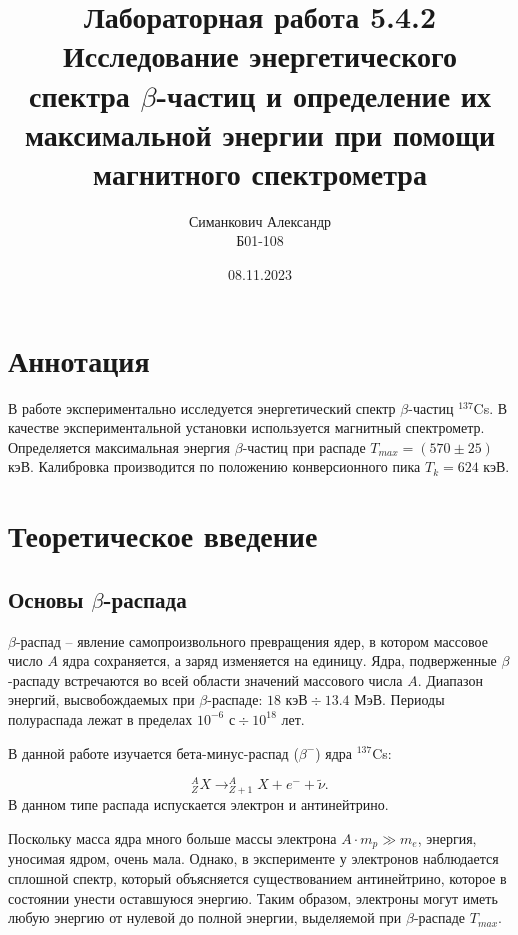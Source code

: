 \documentclass[12pt,a4paper]{article}
\title{Лабораторная работа 5.4.2 \\ Исследование энергетического спектра $\beta$-частиц и определение их максимальной энергии при помощи магнитного спектрометра}
\author{Симанкович Александр\\ Б01-108}
\date{08.11.2023}
\begin{document}
	\maketitle
	
	\section*{Аннотация}
	
	В работе экспериментально исследуется энергетический спектр $\beta$-частиц $^{137}$Cs. В качестве экспериментальной установки используется магнитный спектрометр. Определяется максимальная энергия $\beta$-частиц при распаде  $T_{max} = (570 \pm 25)$ кэВ. Калибровка производится по положению конверсионного пика $T_k = 624$ кэВ.
	
	
	\section*{Теоретическое введение}
	
	\subsection*{Основы $\beta$-распада}
	
	$\beta$-распад -- явление самопроизвольного превращения ядер, в котором массовое число $A$ ядра сохраняется, а заряд изменяется на единицу. Ядра, подверженные $\beta$-распаду встречаются во всей области значений массового числа $A$. Диапазон энергий, высвобождаемых при $\beta$-распаде: $18 \text{ кэВ} \div 13.4 \text{ МэВ}$. Периоды полураспада лежат в пределах $10^{-6} \text{ с} \div 10^{18} \text{ лет}$.
	
	В данной работе изучается бета-минус-распад ($\beta^{-}$) ядра $^{137}$Cs:
	
	\begin{equation}
		^A_Z X \rightarrow ^{A}_{Z+1} X + e^{-} + \tilde{\nu}.
	\end{equation}
	В данном типе распада испускается электрон и антинейтрино.
	
	Поскольку масса ядра много больше массы электрона $A \cdot m_{p} \gg m_{e}$, энергия, уносимая ядром, очень мала. Однако, в эксперименте у электронов наблюдается сплошной спектр, который объясняется существованием антинейтрино, которое в состоянии унести оставшуюся энергию. Таким образом, электроны могут иметь любую энергию от нулевой до полной энергии, выделяемой при $\beta$-распаде $T_{max}$.
	
\end{document}
